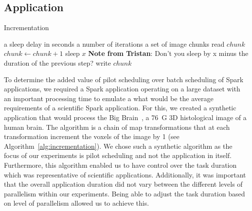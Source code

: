\documentclass{IEEEtran}
\newcommand{\Desc}[2]{\State \makebox[2em][l]{#1}#2}
\newcommand{\tristan}[1]{\color{red}\textbf{Note from Tristan}:
      #1 \color{black}}
\newcommand{\TG}[1]{\tristan{#1}}
\begin{document}
    \subsection{Application}
        \begin{algorithm}\caption{Incrementation}\label{alg:incrementation}              
            \begin{algorithmic}[1]                                                       
                \Input                                                                       
                    \Desc{$x$}{a sleep delay in seconds}                                         
                    \Desc{$n$}{a number of iterations}                                           
                    \Desc{$C$}{a set of image chunks}                                            
                \EndInput                                                                    
                    \State read $chunk$                                        
                        \State $chunk\gets chunk+1$                                              
                        \State sleep $x$ \TG{Don't you sleep by x minus the duration of the previous step?}                                                        
                    \EndFor                                                                      
                    \State write $chunk$                                            
                \EndFor                                                                      
            \end{algorithmic}                                                                
        \end{algorithm}
    To determine the added value of pilot scheduling over batch scheduling of Spark
    applications, we required a Spark application operating on a large dataset with
    an important processing time to emulate a what would be the average requirements
    of a scientific Spark application. For this, we created a synthetic application 
    that would process the Big Brain~\cite{amunts2013bigbrain}, a 76~G 3D histological
    image of a human brain. The algorithm is a chain of map transformations that
    at each transformation increment the voxels of the image by 1 (see Algorithm~\ref{alg:incrementation}).
    We chose such a synthetic algorithm
    as the focus of our experiments is pilot scheduling and not the application in
    itself. Furthermore, this algorithm enabled us to have control over the task duration
    which was representative of scientific applications. Additionally, it was important
    that the overall application duration did not vary between the different levels of
    parallelism within our experiments. Being able to adjust the task duration based on
    level of parallelism allowed us to achieve this.
\end{document}
